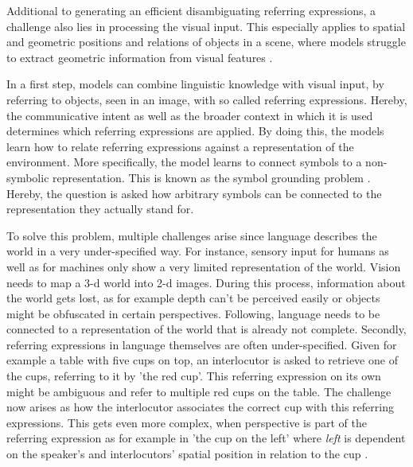 Additional to generating an efficient disambiguating referring expressions, a challenge also lies in processing the visual input.
This especially applies to spatial and geometric positions and relations of objects in a scene, where models struggle to extract geometric information from visual features \citep{Kelleher2017}.


In a first step, models can combine linguistic knowledge with visual input, by referring to objects, seen in an image, with so called referring expressions.
Hereby, the communicative intent as well as the broader context in which it is used determines which referring expressions are applied.
By doing this, the models learn how to relate referring expressions against a representation of the environment.
More specifically, the model learns to connect symbols to a non-symbolic representation.
This is known as the symbol grounding problem \citep{Harnad1990,Roy2002}.
Hereby, the question is asked how arbitrary symbols can be connected to the representation they actually stand for.

To solve this problem, multiple challenges arise since language describes the world in a very under-specified way.
For instance, sensory input for humans as well as for machines only show a very limited representation of the world.
Vision needs to map a 3-d world into 2-d images.
During this process, information about the world gets lost, as for example depth can't be perceived easily or objects might be obfuscated in certain perspectives.
Following, language needs to be connected to a representation of the world that is already not complete.
Secondly, referring expressions in language themselves are often under-specified.
Given for example a table with five cups on top, an interlocutor is asked to retrieve one of the cups, referring to it by 'the red cup'.
This referring expression on its own might be ambiguous and refer to multiple red cups on the table.
The challenge now arises as how the interlocutor associates the correct cup with this referring expressions.
This gets even more complex, when perspective is part of the referring expression as for example in 'the cup on the left' where \emph{left} is dependent on the speaker's and interlocutors' spatial position in relation to the cup \citep{Dobnik2021}.


